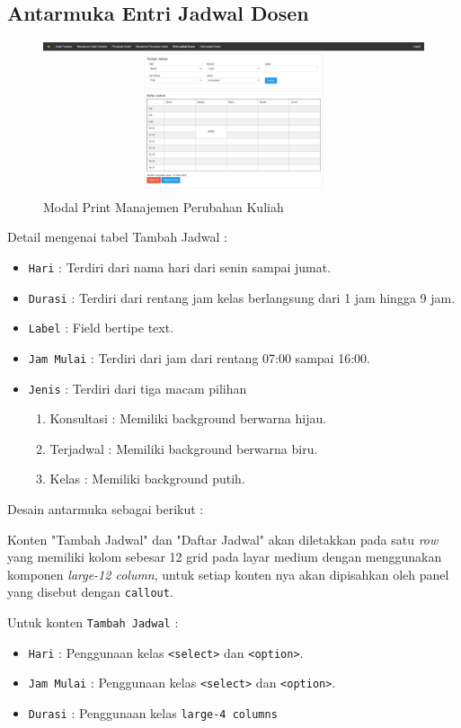 \documentclass[a4paper,twoside]{article}
\begin{document}
\begin{enumerate}
		\subsection{Antarmuka Entri Jadwal Dosen}
		\begin{figure} [H]
			\centering  
			\includegraphics[scale=0.5]{Tampilan-Entri-Jadwal-Dosen.png}  
			\caption{Modal Print Manajemen Perubahan Kuliah} 
		\end{figure}
		
		Detail mengenai tabel Tambah Jadwal :
		\begin{itemize}
			\item \texttt{Hari} : Terdiri dari nama hari dari senin sampai jumat.
			\item \texttt{Durasi} : Terdiri dari rentang jam kelas berlangsung dari 1 jam hingga 9 jam.
			\item \texttt{Label} : Field bertipe text.
			\item \texttt{Jam Mulai} : Terdiri dari jam dari rentang 07:00 sampai 16:00.
			\item \texttt{Jenis} : Terdiri dari tiga macam pilihan 
			\begin{enumerate}
				\item Konsultasi : Memiliki background berwarna hijau.
				\item Terjadwal : Memiliki background berwarna biru.
				\item Kelas : Memiliki background putih.
			\end{enumerate}
		\end{itemize}
		
		Desain antarmuka sebagai berikut : \par
		Konten "Tambah Jadwal" dan "Daftar Jadwal" akan diletakkan pada satu \textit{row} yang memiliki kolom sebesar 12 grid pada layar medium dengan menggunakan komponen \textit{large-12 column}, untuk setiap konten nya akan dipisahkan oleh panel yang disebut dengan \texttt{callout}. \par
		Untuk konten \texttt{Tambah Jadwal} :
		\begin{itemize}
			\item \texttt{Hari} : Penggunaan kelas \texttt{<select>} dan \texttt{<option>}.
			\item \texttt{Jam Mulai} : Penggunaan kelas \texttt{<select>} dan \texttt{<option>}.
			\item \texttt{Durasi} : Penggunaan kelas \texttt{large-4 columns}
		\end{itemize}
		

\end{enumerate}
\end{document}
